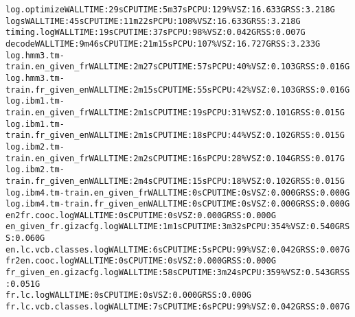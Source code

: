 \documentclass[11pt,letterpaper]{article}
\begin{document}
\begin{tiny}
\begin{alltt}
            log.optimize                                  WALL TIME: 29s      CPU TIME: 5m37s     PCPU: 129\%   VSZ: 16.633G   RSS: 3.218G
         logs                                             WALL TIME: 45s      CPU TIME: 11m22s    PCPU: 108\%   VSZ: 16.633G   RSS: 3.218G
         timing.log                                       WALL TIME: 19s      CPU TIME: 37s       PCPU: 98\%    VSZ: 0.042G    RSS: 0.007G
      decode                                              WALL TIME: 9m46s    CPU TIME: 21m15s    PCPU: 107\%   VSZ: 16.727G   RSS: 3.233G
         log.hmm3.tm-train.en_given_fr                    WALL TIME: 2m27s    CPU TIME: 57s       PCPU: 40\%    VSZ: 0.103G    RSS: 0.016G
         log.hmm3.tm-train.fr_given_en                    WALL TIME: 2m15s    CPU TIME: 55s       PCPU: 42\%    VSZ: 0.103G    RSS: 0.016G
         log.ibm1.tm-train.en_given_fr                    WALL TIME: 2m1s     CPU TIME: 19s       PCPU: 31\%    VSZ: 0.101G    RSS: 0.015G
         log.ibm1.tm-train.fr_given_en                    WALL TIME: 2m1s     CPU TIME: 18s       PCPU: 44\%    VSZ: 0.102G    RSS: 0.015G
         log.ibm2.tm-train.en_given_fr                    WALL TIME: 2m2s     CPU TIME: 16s       PCPU: 28\%    VSZ: 0.104G    RSS: 0.017G
         log.ibm2.tm-train.fr_given_en                    WALL TIME: 2m4s     CPU TIME: 15s       PCPU: 18\%    VSZ: 0.102G    RSS: 0.015G
         log.ibm4.tm-train.en_given_fr                    WALL TIME: 0s       CPU TIME: 0s                     VSZ: 0.000G    RSS: 0.000G
         log.ibm4.tm-train.fr_given_en                    WALL TIME: 0s       CPU TIME: 0s                     VSZ: 0.000G    RSS: 0.000G
            en2fr.cooc.log                                WALL TIME: 0s       CPU TIME: 0s                     VSZ: 0.000G    RSS: 0.000G
            en_given_fr.gizacfg.log                       WALL TIME: 1m1s     CPU TIME: 3m32s     PCPU: 354\%   VSZ: 0.540G    RSS: 0.060G
            en.lc.vcb.classes.log                         WALL TIME: 6s       CPU TIME: 5s        PCPU: 99\%    VSZ: 0.042G    RSS: 0.007G
            fr2en.cooc.log                                WALL TIME: 0s       CPU TIME: 0s                     VSZ: 0.000G    RSS: 0.000G
            fr_given_en.gizacfg.log                       WALL TIME: 58s      CPU TIME: 3m24s     PCPU: 359\%   VSZ: 0.543G    RSS: 0.051G
            fr.lc.log                                     WALL TIME: 0s       CPU TIME: 0s                     VSZ: 0.000G    RSS: 0.000G
            fr.lc.vcb.classes.log                         WALL TIME: 7s       CPU TIME: 6s        PCPU: 99\%    VSZ: 0.042G    RSS: 0.007G

\end{alltt}
\end{tiny}
\end{document}
